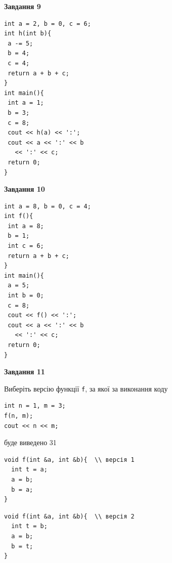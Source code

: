 \documentclass[12pt, ukrainian]{article}
\def\code#1{\Verb!#1!}
\begin{document}
{\begin {large}
\begin{minipage}[t]{11.0cm}
\end{minipage}


\begin{minipage}[t]{7.0cm}

\begin{center}
\textbf{Завдання 9}
\end{center}
\vspace{-8mm}

\begin{verbatim}
int a = 2, b = 0, c = 6;
int h(int b){
 a -= 5;
 b = 4;
 c = 4;
 return a + b + c;
}
int main(){
 int a = 1;
 b = 3;
 c = 8;
 cout << h(a) << ':';
 cout << a << ':' << b 
   << ':' << c;
 return 0;
}
\end{verbatim}



\begin{center}
\textbf{Завдання 10}
\end{center}
\vspace{-8mm}

\begin{verbatim}
int a = 8, b = 0, c = 4;
int f(){
 int a = 8;
 b = 1;
 int c = 6;
 return a + b + c;
}
int main(){
 a = 5;
 int b = 0;
 c = 8;
 cout << f() << ':';
 cout << a << ':' << b 
   << ':' << c;
 return 0;
}
\end{verbatim}

\end{minipage}
\vline \hspace{1mm}
\begin{minipage}[t]{11.0cm}

\begin{center}
\textbf{Завдання 11}
\end{center}
Виберіть версію функції \code{f}, за якої за виконання коду
\begin{verbatim}
int n = 1, m = 3;
f(n, m);
cout << n << m;
\end{verbatim}

буде виведено 31

\begin{verbatim}
void f(int &a, int &b){  \\ версія 1
  int t = a;
  a = b;
  b = a;
}
\end{verbatim}

\vspace{-8mm}\begin{verbatim}
void f(int &a, int &b){  \\ версія 2
  int t = b;
  a = b;
  b = t;
}
\end{verbatim}


\end{minipage}
\end{large}}
\end{document}
